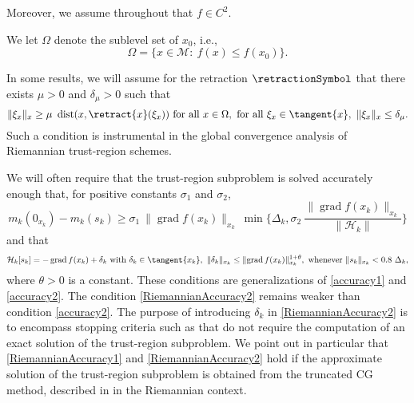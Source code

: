 Moreover, we assume throughout that $f \in C^2$.

We let $\Omega$ denote the sublevel set of $x_0$, i.e.,
\begin{equation*}
    \Omega = \{ x \in \mathcal{M} \colon \ f(x) \leq f(x_0) \}.
\end{equation*}

In some results, we will assume for the retraction $\retractionSymbol$ that there exists $\mu > 0$ and $\delta_{\mu} > 0$ such that
\begin{equation}\label{RetractionAssumption}
    \lVert \xi_x \rVert_x \geq \mu \ \operatorname{dist}(x, \retract{x}(\xi_x)) \text{ for all } x \in \Omega, \text{ for all } \xi_x \in \tangent{x}, \ \lVert \xi_x \rVert_x \leq \delta_{\mu}.
\end{equation}
Such a condition is instrumental in the global convergence analysis of Riemannian trust-region schemes.

We will often require that the trust-region subproblem is solved accurately enough that, for positive constants $\sigma_1$ and $\sigma_2$,
\begin{equation}\label{RiemannianAccuracy1}
    m_k(0_{x_k}) - m_k(s_k) \geq \sigma_1 \ \lVert \operatorname{grad} f(x_k) \rVert_{x_k} \ \min \{ \Delta_k, \sigma_2 \ \frac{\lVert \operatorname{grad} f(x_k) \rVert_{x_k}}{\lVert \mathcal{H}_k \rVert} \}
\end{equation} 
and that
\begin{equation}\label{RiemannianAccuracy2}
    \mathcal{H}_k [s_k] = - \operatorname{grad} f(x_k) + \delta_k \text{ with } \delta_k \in \tangent{x_k}, \ \lVert \delta_k \rVert_{x_k} \leq \lVert \operatorname{grad} f(x_k) \rVert^{1 + \theta}_{x_k}, \text{ whenever } \lVert s_k \rVert_{x_k} < 0.8 \ \Delta_k,
\end{equation}
where $\theta > 0$ is a constant. These conditions are generalizations of \cref{accuracy1} and \cref{accuracy2}. The condition \cref{RiemannianAccuracy2} remains weaker than condition \cref{accuracy2}. The purpose of introducing $\delta_k$ in \cref{RiemannianAccuracy2} is to encompass stopping criteria such as \cite[(7.10)]{AbsilMahonySepulchre:2008} that do not require the computation of an exact solution of the trust-region subproblem. We point out in particular that \cref{RiemannianAccuracy1} and \cref{RiemannianAccuracy2} hold if the approximate solution of the trust-region subproblem is obtained from the truncated CG method, described in \cite[§~7.3.2]{AbsilMahonySepulchre:2008} in the Riemannian context.


